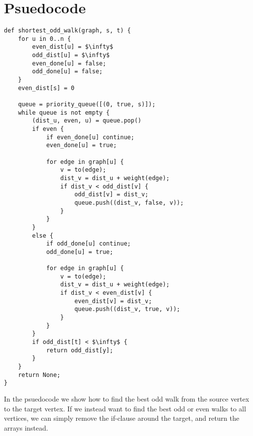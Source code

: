 \section{Psuedocode}

\begin{lstlisting}[caption={Shortest Odd Walk},label=Listing,mathescape=true]
def shortest_odd_walk(graph, s, t) {
    for u in 0..n {
        even_dist[u] = $\infty$
        odd_dist[u] = $\infty$
        even_done[u] = false;
        odd_done[u] = false;
    }
    even_dist[s] = 0

    queue = priority_queue([(0, true, s)]);
    while queue is not empty {
        (dist_u, even, u) = queue.pop()
        if even {
            if even_done[u] continue;
            even_done[u] = true;

            for edge in graph[u] {
                v = to(edge);
                dist_v = dist_u + weight(edge);
                if dist_v < odd_dist[v] {
                    odd_dist[v] = dist_v;
                    queue.push((dist_v, false, v));
                }
            }
        }
        else {
            if odd_done[u] continue;
            odd_done[u] = true;

            for edge in graph[u] {
                v = to(edge);
                dist_v = dist_u + weight(edge);
                if dist_v < even_dist[v] {
                    even_dist[v] = dist_v;
                    queue.push((dist_v, true, v));
                }
            }
        }
        if odd_dist[t] < $\infty$ {
            return odd_dist[y];
        }
    }
    return None;
}
\end{lstlisting}

In the psuedocode we show how to find the best odd walk from the source vertex to the target vertex. If we instead want to find the best odd or even walks to all vertices, we can simply remove the if-clause around the target, and return the arrays instead.